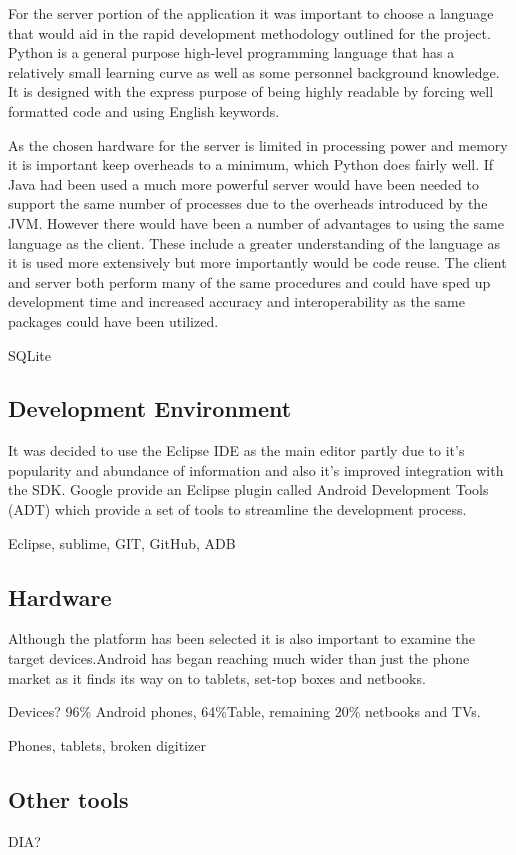 For the server portion of the application it was important to choose a language that would aid in the rapid development methodology outlined for the project. Python is a general purpose high-level programming language that has a relatively small learning curve as well as some personnel background knowledge. It is designed with the express purpose of being highly readable by forcing well formatted code and using English keywords. 

As the chosen hardware for the server is limited in processing power and memory it is important keep overheads to a minimum, which Python does fairly well. If Java had been used a much more powerful server would have been needed to support the same number of processes due to the overheads introduced by the JVM. However there would have been a number of advantages to using the same language as the client. These include a greater understanding of the language as it is used more extensively but more importantly would be code reuse. The client and server both perform many of the same procedures and could have sped up development time and increased accuracy and interoperability as the same packages could have been utilized.

SQLite

\subsection{Development Environment}
It was decided to use the Eclipse IDE as the main editor partly due to it's popularity and abundance of information and also it's improved integration with the SDK. Google provide an Eclipse plugin called Android Development Tools (ADT) which provide a set of tools to streamline the development process. 

Eclipse, sublime, GIT, GitHub, ADB

\subsection{Hardware}
Although the platform has been selected it is also important to examine the target devices.Android has began reaching much wider than just the phone market as it finds its way on to tablets, set-top boxes and netbooks.

Devices? 96\% Android phones, 64\%Table, remaining 20\% netbooks and TVs.

Phones, tablets, broken digitizer

\subsection{Other tools}
DIA?